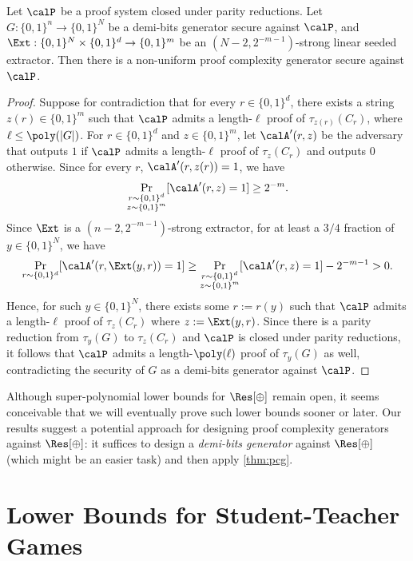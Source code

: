 \begin{theorem}\label{thm:pcg}
    Let $\calP$ be a proof system closed under parity reductions. Let $G: \{0, 1\}^n \to \{0, 1\}^N$ be a demi-bits generator secure against $\calP$, and $\Ext: \{0, 1\}^N \times \{0, 1\}^d \to \{0, 1\}^m$ be an $(N-2, 2^{-m-1})$-strong linear seeded extractor. Then there is a non-uniform proof complexity generator secure against $\calP$.
\end{theorem}
\begin{proof}
    Suppose for contradiction that for every $r\in \{0, 1\}^d$, there exists a string $z(r) \in \{0, 1\}^m$ such that $\calP$ admits a length-$\ell$ proof of $\tau_{z(r)}(C_r)$, where $\ell \le \poly(|G|)$. For $r \in \{0, 1\}^d$ and $z\in \{0, 1\}^m$, let $\calA'(r, z)$ be the adversary that outputs $1$ if $\calP$ admits a length-$\ell$ proof of $\tau_z(C_r)$ and outputs $0$ otherwise. Since for every $r$, $\calA'(r, z(r)) = 1$, we have
    \[\Pr_{\substack{r\sim \{0, 1\}^d\\z\sim \{0, 1\}^m}}[\calA'(r, z) = 1] \ge 2^{-m}.\]
    Since $\Ext$ is a $(n-2, 2^{-m-1})$-strong extractor, for at least a $3/4$ fraction of $y \in \{0, 1\}^N$, we have
    \[\Pr_{r\sim \{0, 1\}^d}[\calA'(r, \Ext(y, r)) = 1] \ge \Pr_{\substack{r\sim \{0, 1\}^d\\z\sim \{0, 1\}^m}}[\calA'(r, z) = 1] - 2^{-m-1} > 0.\]
    Hence, for such $y \in \{0, 1\}^N$, there exists some $r := r(y)$ such that $\calP$ admits a length-$\ell$ proof of $\tau_z(C_r)$ where $z := \Ext(y, r)$. Since there is a parity reduction from $\tau_y(G)$ to $\tau_z(C_r)$ and $\calP$ is closed under parity reductions, it follows that $\calP$ admits a length-$\poly(\ell)$ proof of $\tau_y(G)$ as well, contradicting the security of $G$ as a demi-bits generator against $\calP$.
\end{proof}

Although super-polynomial lower bounds for $\Res[\oplus]$ remain open, it seems conceivable that we will eventually prove such lower bounds sooner or later. Our results suggest a potential approach for designing proof complexity generators against $\Res[\oplus]$: it suffices to design a \emph{demi-bits generator} against $\Res[\oplus]$ (which might be an easier task) and then apply \autoref{thm:pcg}.






\section{Lower Bounds for Student-Teacher Games}\label{sec:proof-complexity-app}

